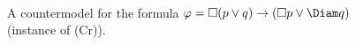 \begin{figure}[t]
\[\begin{array}{c}
  \end{array}
  \]
  
  \caption{A countermodel for the formula $\varphi=\Box (p\lor q)\to
    (\Box p \lor \Diam q) $ (instance of (Cr)).}
  \label{fig:countGW}
\end{figure}




